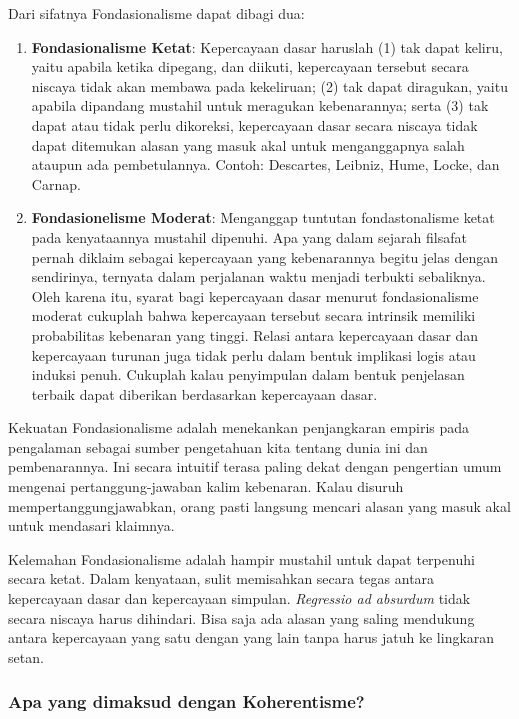 \documentclass[11pt,twoside,a5paper,openany]{memoir}
\begin{document}
Dari sifatnya Fondasionalisme dapat dibagi dua:

\begin{enumerate}
\def\labelenumi{\arabic{enumi}.}
\item
  \textbf{Fondasionalisme Ketat}: Kepercayaan dasar haruslah (1) tak
  dapat keliru, yaitu apabila ketika dipegang, dan diikuti, kepercayaan
  tersebut secara niscaya tidak akan membawa pada kekeliruan; (2) tak
  dapat diragukan, yaitu apabila dipandang mustahil untuk meragukan
  kebenarannya; serta (3) tak dapat atau tidak perlu dikoreksi,
  kepercayaan dasar secara niscaya tidak dapat ditemukan alasan yang
  masuk akal untuk menganggapnya salah ataupun ada pembetulannya.
  Contoh: Descartes, Leibniz, Hume, Locke, dan Carnap.
\item
  \textbf{Fondasionelisme Moderat}: Menganggap tuntutan fondastonalisme
  ketat pada kenyataannya mustahil dipenuhi. Apa yang dalam sejarah
  filsafat pernah diklaim sebagai kepercayaan yang kebenarannya begitu
  jelas dengan sendirinya, ternyata dalam perjalanan waktu menjadi
  terbukti sebaliknya. Oleh karena itu, syarat bagi kepercayaan dasar
  menurut fondasionalisme moderat cukuplah bahwa kepercayaan tersebut
  secara intrinsik memiliki probabilitas kebenaran yang tinggi. Relasi
  antara kepercayaan dasar dan kepercayaan turunan juga tidak perlu
  dalam bentuk implikasi logis atau induksi penuh. Cukuplah kalau
  penyimpulan dalam bentuk penjelasan terbaik dapat diberikan
  berdasarkan kepercayaan dasar.
\end{enumerate}

Kekuatan Fondasionalisme adalah menekankan penjangkaran empiris pada
pengalaman sebagai sumber pengetahuan kita tentang dunia ini dan
pembenarannya. Ini secara intuitif terasa paling dekat dengan pengertian
umum mengenai pertanggung-jawaban kalim kebenaran. Kalau disuruh
mempertanggungjawabkan, orang pasti langsung mencari alasan yang masuk
akal untuk mendasari klaimnya.

Kelemahan Fondasionalisme adalah hampir mustahil untuk dapat terpenuhi
secara ketat. Dalam kenyataan, sulit memisahkan secara tegas antara
kepercayaan dasar dan kepercayaan simpulan. \emph{Regressio ad absurdum}
tidak secara niscaya harus dihindari. Bisa saja ada alasan yang saling
mendukung antara kepercayaan yang satu dengan yang lain tanpa harus
jatuh ke lingkaran setan.

\hypertarget{apa-yang-dimaksud-dengan-koherentisme}{%
\subsubsection{Apa yang dimaksud dengan
Koherentisme?}\label{apa-yang-dimaksud-dengan-koherentisme}}
\end{document}
